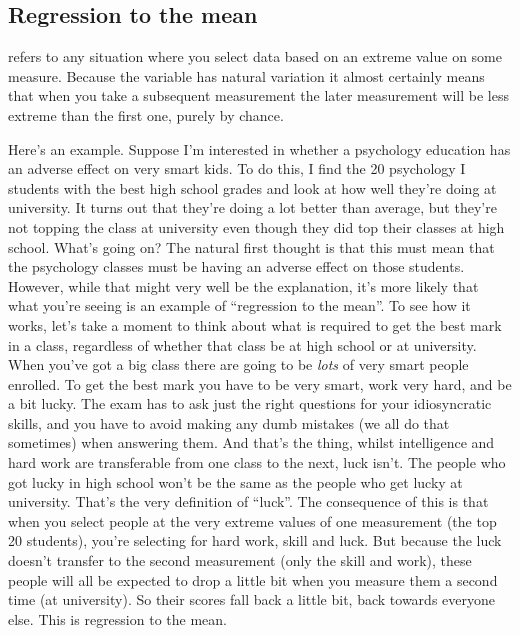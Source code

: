 \subsection{Regression to the mean}

 refers to any situation where you select data based on an extreme value on some measure. Because the variable has natural variation it almost certainly means that when you take a subsequent measurement the later measurement will be less extreme than the first one, purely by chance. 

Here's an example. Suppose I'm interested in whether a psychology education has an adverse effect on very smart kids. To do this, I find the 20 psychology I students with the best high school grades and look at how well they're doing at university. It turns out that they're doing a lot better than average, but they're not topping the class at university even though they did top their classes at high school. What's going on? The natural first thought is that this must mean that the psychology classes must be having an adverse effect on those students. However, while that might very well be the explanation, it's more likely that what you're seeing is an example of ``regression to the mean''.  To see how it works, let's take a moment to think about what is required to get the best mark in a class, regardless of whether that class be at high school or at university. When you've got a big class there are going to be {\it lots} of very smart people enrolled. To get the best mark you have to be very smart, work very hard, and be a bit lucky. The exam has to ask just the right questions for your idiosyncratic skills, and you have to avoid making any dumb mistakes (we all do that sometimes) when answering them. And that's the thing, whilst intelligence and hard work are transferable from one class to the next, luck isn't. The people who got lucky in high school won't be the same as the people who get lucky at university. That's the very definition of ``luck''. The consequence of this is that when you select people at the very extreme values of one measurement (the top 20 students), you're selecting for hard work, skill and luck. But because the luck doesn't transfer to the second measurement (only the skill and work), these people will all be expected to drop a little bit when you measure them a second time (at university). So their scores fall back a little bit, back towards everyone else. This is regression to the mean.

